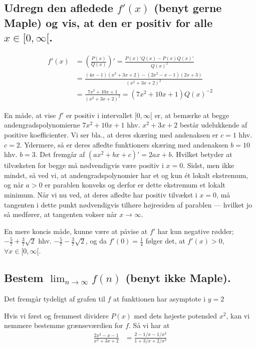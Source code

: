 \documentclass[11pt,a4paper]{article}
\begin{document}
\subsection{\mdseries Udregn den afledede $f'(x)$ (benyt gerne Maple) og vis,
    at den er positiv for alle $x \in [0,\infty[$.}
\begin{align}
    f'(x) &= \left( \frac{P(x)}{Q(x)} \right)'
           = \frac{P(x)' Q(x) - P(x) Q(x)'}{Q(x)^2} \\
          &= \frac{(4x - 1)(x^2 + 3x + 2) - (2x^2 - x - 1)(2x + 3)}
                  {(x^2 + 3x + 2)^2} \\
          &= \frac{7x^2 + 10x + 1}{(x^2 + 3x + 2)^2}
           = (7x^2 + 10x + 1) Q(x)^{-2}
           \label{eqn:f'}
\end{align}

En måde, at vise $f'$ er positiv i intervallet $[0,\infty[$ er, at bemærke at
begge andengradspolynomierne $7x^2 + 10x + 1$ hhv. $x^2 + 3x + 2$ består
udelukkende af positive koefficienter. Vi ser bla., at deres skæring med
andenaksen er $c = 1$ hhv. $c = 2$. Ydermere, så er deres afledte funktioners
skæring med andenaksen $b = 10$ hhv. $b = 3$. Det fremgår af $(ax^2 + bx + c)'
= 2ax + b$. Hvilket betyder at tilvæksten for begge må nødvendigvis være
positiv i $x = 0$. Sidst, men ikke mindst, så ved vi, at andengradspolynomier
har et og kun ét lokalt ekstremum, og når $a > 0$ er parablen konveks og
derfor er dette ekstremum et lokalt minimum. Når vi nu ved, at deres afledte
har positiv tilvækst i $x = 0$, må tangenten i dette punkt nødvendigvis
tilhøre højresiden af parablen --- hvilket jo så medfører, at tangenten vokser
når $x \rightarrow \infty$.

En mere koncis måde, kunne være at påvise at $f'$ har kun negative rødder;
$-\frac{5}{7} + \frac{3}{7} \sqrt{2}$ hhv. $-\frac{5}{7} - \frac{3}{7}
\sqrt{2}$, og da $f'(0) = \frac{1}{4}$ følger det, at $f'(x) > 0$, $\forall x
\in [0,\infty[$.

\subsection{\mdseries Bestem $\lim_{n \rightarrow \infty}f(n)$ (benyt ikke
    Maple).}
Det fremgår tydeligt af grafen til $f$ at funktionen har asymptote i $y = 2$

Hvis vi først og fremmest dividere $P(x)$ med dets højeste potensled $x^2$,
kan vi nemmere bestemme grænseværdien for $f$. Så vi har at
\begin{align}
    \frac{2x^2 - x - 1}{x^2 + 3x + 2} &= \frac{2 - 1/x - 1/x^2}{1 + 3/x + 2/x^2}
\end{align}
\end{document}
